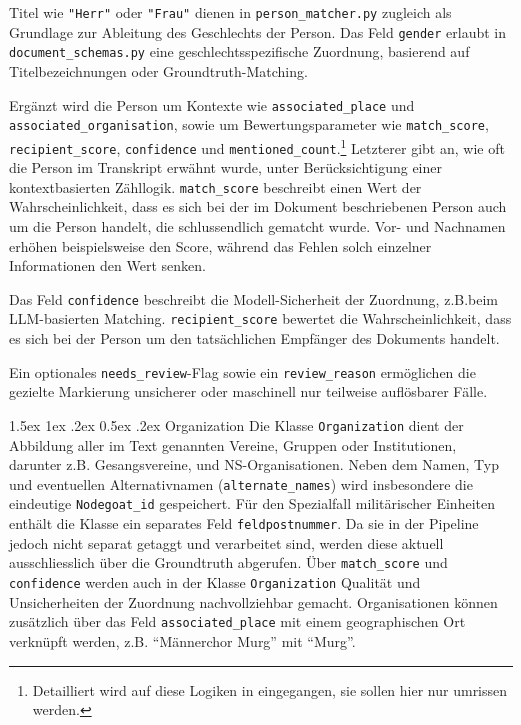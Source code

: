 \documentclass[12pt, a4paper, ngerman, bidi=default]{article}
\makeatletter
\newcommand{\code}[1]{\colorbox{VeryLightGray}{\texttt{#1}}} %
\let\oldparagraph\paragraph%
\renewcommand{\paragraph}{
    \@ifstar%
      \xxxParagraphStar%
      \xxxParagraphNoStar%
 }
\newcommand{\xxxParagraphStar}[1]{\oldparagraph*{#1}\mbox{}}
\newcommand{\xxxParagraphNoStar}[1]{\oldparagraph{#1}\mbox{}}
\renewcommand\paragraph{\@startsection{paragraph}{4}{0em}%
  {1.5ex \@plus1ex \@minus.2ex}%
  {0.5ex \@plus.2ex}%
  {\normalfont\normalsize\bfseries\itshape}}
\makeatother
\begin{document}
Titel wie \code{"Herr"} oder \code{"Frau"} dienen in \code{person\_matcher.py} zugleich als Grundlage zur 
Ableitung des Geschlechts der Person. Das Feld \code{gender} erlaubt in \code{document\_schemas.py} eine 
geschlechtsspezifische Zuordnung, basierend auf Titelbezeichnungen oder Groundtruth-Matching. 

Ergänzt wird die Person um Kontexte wie \code{associated\_place} und \code{associated\_organisation}, sowie um Bewertungsparameter 
wie \code{match\_score}, \code{recipient\_score}, \code{confidence} und \code{mentioned\_count}.\footnote{Detailliert wird auf diese Logiken in 
 eingegangen, sie sollen hier nur umrissen werden.} 
Letzterer gibt an, wie oft 
die Person im Transkript erwähnt wurde, unter Berücksichtigung einer kontextbasierten Zähllogik.
\code{match\_score} beschreibt einen Wert der Wahrscheinlichkeit, dass es sich bei der im Dokument beschriebenen Person auch 
um die Person handelt, die schlussendlich gematcht wurde. Vor- und Nachnamen erhöhen beispielsweise den Score, während das
Fehlen solch einzelner Informationen den Wert senken. 

Das Feld \code{confidence} beschreibt die Modell-Sicherheit der Zuordnung, z.B.beim LLM-basierten Matching. 
\code{recipient\_score} bewertet die Wahrscheinlichkeit, dass es sich bei der Person um den tatsächlichen Empfänger des Dokuments handelt. 

Ein optionales \code{needs\_review}-Flag sowie ein \code{review\_reason} ermöglichen die gezielte Markierung unsicherer oder 
maschinell nur teilweise auflösbarer Fälle.

\paragraph{Organization}
Die Klasse \code{Organization} dient der Abbildung aller im Text genannten Vereine, Gruppen oder Institutionen, 
darunter z.B. Gesangsvereine, und NS-Organisationen. Neben dem Namen, Typ und eventuellen 
Alternativnamen (\code{alternate\_names}) wird insbesondere die eindeutige \code{Nodegoat\_id} gespeichert. Für den Spezialfall 
militärischer Einheiten enthält die Klasse ein separates Feld \code{feldpostnummer}. Da sie in der Pipeline jedoch nicht separat getaggt und verarbeitet sind,
werden diese aktuell ausschliesslich über die Groundtruth abgerufen. Über \code{match\_score} und \code{confidence} 
werden auch in der Klasse \code{Organization} Qualität und Unsicherheiten der Zuordnung nachvollziehbar gemacht. 
Organisationen können zusätzlich über das Feld \code{associated\_place} mit einem geographischen Ort verknüpft werden, z.B. \enquote{Männerchor Murg} mit \enquote{Murg}.
\end{document}

